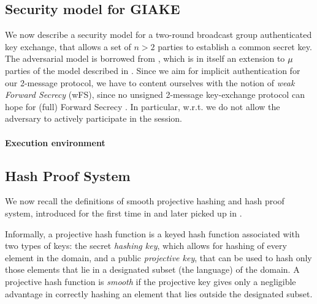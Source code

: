 \subsection{Security model for GIAKE}\label{subsec:secmodel}
We now describe a security model for a two-round broadcast group authenticated key exchange, that allows a set of $n > 2$ parties to establish a common secret key.
The adversarial model is borrowed from \cite[Section 6.1]{PQR22}, which is in itself an extension to $\mu$ parties of the model described in \cite{JKRS20}.
Since we aim for implicit authentication for our 2-message protocol, we have to content ourselves with the notion of \textit{weak Forward Secrecy} (wFS), since no unsigned 2-message key-exchange protocol can hope for (full) Forward Secrecy \cite[Section 3.2]{HMQV}.
In particular, w.r.t. \cite[Section 6.1]{PQR22} we do not allow the adversary to actively participate in the session.

\paragraph{Execution environment}



\subsection{Hash Proof System}\label{subsec:HPF}
We now recall the definitions of smooth projective hashing and hash proof system, introduced for the first time in \cite{CS02} and later picked up in \cite{JKRS20}.

Informally, a projective hash function is a keyed hash function associated with two types of keys: the secret \textit{hashing key}, which allows for hashing of every element in the domain, and a public \textit{projective key}, that can be used to hash only those elements that lie in a designated subset (the language) of the domain.
A projective hash function is \textit{smooth} if the projective key gives only a negligible advantage in correctly hashing an element that lies outside the designated subset.

